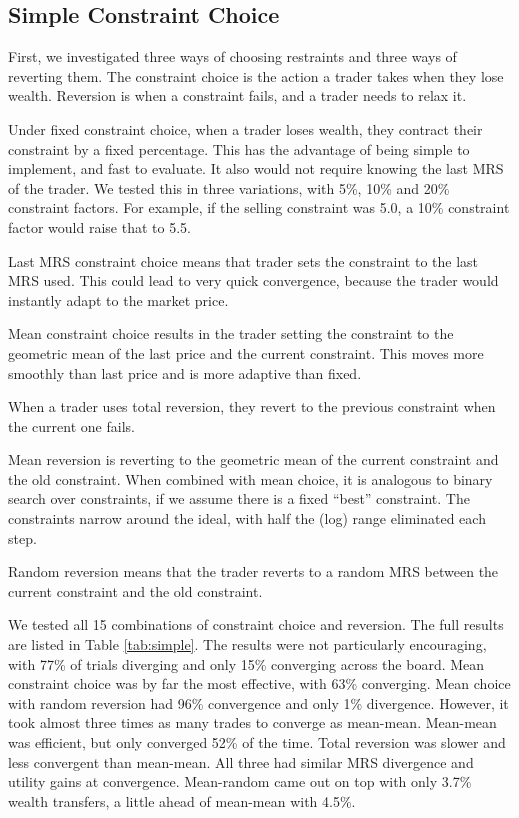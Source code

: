 \documentclass[12pt,a4paper,titlepage]{article}
\begin{document}
\subsection{Simple Constraint Choice}
First, we investigated three ways of choosing restraints and three ways of reverting them.
The constraint choice is the action a trader takes when they lose wealth.
Reversion is when a constraint fails, and a trader needs to relax it.

Under fixed constraint choice, when a trader loses wealth, they contract their constraint by a fixed percentage.
This has the advantage of being simple to implement, and fast to evaluate.
It also would not require knowing the last MRS of the trader.
We tested this in three variations, with 5\%, 10\% and 20\% constraint factors.
For example, if the selling constraint was 5.0, a 10\% constraint factor would raise that to 5.5.
    
Last MRS constraint choice means that trader sets the constraint to the last MRS used.
This could lead to very quick convergence, because the trader would instantly adapt to the market price.

Mean constraint choice results in the trader setting the constraint to the geometric mean of the last price and the current constraint.
This moves more smoothly than last price and is more adaptive than fixed.

When a trader uses total reversion, they revert to the previous constraint when the current one fails.

Mean reversion is reverting to the geometric mean of the current constraint and the old constraint.
When combined with mean choice, it is analogous to binary search over constraints, if we assume there is a fixed ``best'' constraint.
The constraints narrow around the ideal, with half the (log) range eliminated each step.

Random reversion means that the trader reverts to a random MRS between the current constraint and the old constraint.

We tested all 15 combinations of constraint choice and reversion.
The full results are listed in Table \ref{tab:simple}.
The results were not particularly encouraging, with 77\% of trials diverging and only 15\% converging across the board.
Mean constraint choice was by far the most effective, with 63\% converging.
Mean choice with random reversion had 96\% convergence and only 1\% divergence.
However, it took almost three times as many trades to converge as mean-mean.
Mean-mean was efficient, but only converged 52\% of the time.
Total reversion was slower and less convergent than mean-mean.
All three had similar MRS divergence and utility gains at convergence.
Mean-random came out on top with only 3.7\% wealth transfers, a little ahead of mean-mean with 4.5\%.
\end{document}
